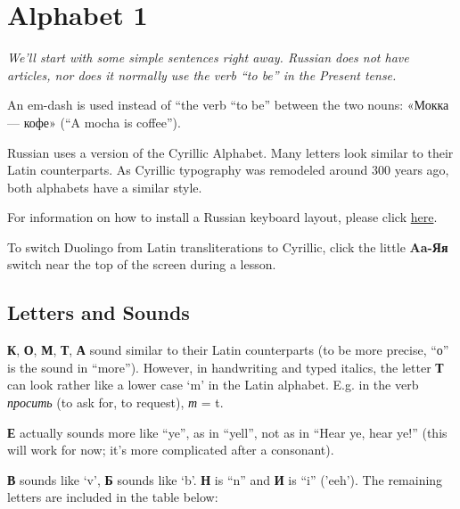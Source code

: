 \chapter{Alphabet 1}\label{alphabet-1}

\emph{We'll start with some simple sentences right away. Russian does
not have articles, nor does it normally use the verb ``to be'' in the
Present tense.}

An em-dash is used instead of ``the verb ``to be'' between the two
nouns: «Мокка --- кофе» (``A mocha is coffee'').

Russian uses a version of the Cyrillic Alphabet. Many letters look
similar to their Latin counterparts. As Cyrillic typography was
remodeled around 300 years ago, both alphabets have a similar style.

For information on how to install a Russian keyboard layout, please
click \href{https://www.duolingo.com/comment/11449014}{here}.

To switch Duolingo from Latin transliterations to Cyrillic, click the
little \textbf{Aa-Яя} switch near the top of the screen during a lesson.

\section{Letters and Sounds}\label{letters-and-sounds}

\textbf{К}, \textbf{О}, \textbf{М}, \textbf{Т}, \textbf{А} sound similar
to their Latin counterparts (to be more precise, ``о'' is the sound in
``more''). However, in handwriting and typed italics, the letter
\textbf{Т} can look rather like a lower case `m' in the Latin alphabet.
E.g. in the verb \emph{просить} (to ask for, to request), \emph{т} = t.

\textbf{Е} actually sounds more like ``ye'', as in ``yell'', not as in
``Hear ye, hear ye!'' (this will work for now; it's more complicated
after a consonant).

\textbf{В} sounds like `v', \textbf{Б} sounds like `b'. \textbf{Н} is
``n'' and \textbf{И} is ``i'' ('eeh'). The remaining letters are
included in the table below:

